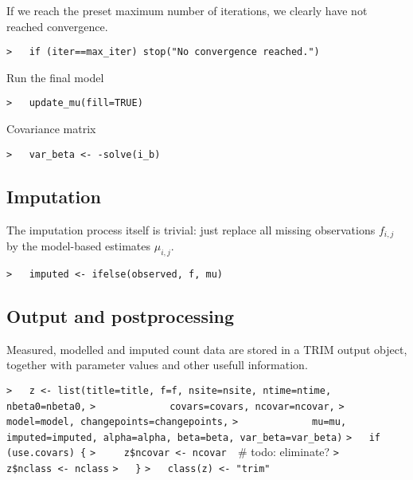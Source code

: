 \documentclass[a4paper]{article}
\begin{document}
If we reach the preset maximum number of iterations, we clearly have not reached
convergence.\par
\verb~>   if (iter==max_iter) stop("No convergence reached.")~\par

Run the final model\par
\verb~>   update_mu(fill=TRUE)~\par

Covariance matrix\par
\verb~>   var_beta <- -solve(i_b)~\par



\subsection{Imputation}\par

The imputation process itself is trivial: just replace all missing observations
$f_{i,j}$ by the model-based estimates $\mu_{i,j}$.\par
\verb~>   imputed <- ifelse(observed, f, mu)~\par




\subsection{Output and postprocessing}\par

Measured, modelled and imputed count data are stored in a TRIM output object,
together with parameter values and other usefull information.\par

\verb~>   z <- list(title=title, f=f, nsite=nsite, ntime=ntime, nbeta0=nbeta0,~\newline
\verb~>             covars=covars, ncovar=ncovar,~\newline
\verb~>             model=model, changepoints=changepoints,~\newline
\verb~>             mu=mu, imputed=imputed, alpha=alpha, beta=beta, var_beta=var_beta)~\newline
\verb~>   if (use.covars) {~\newline
\verb~>     z$ncovar <- ncovar  ~{\sffamily\# todo: eliminate?}\newline
\verb~>     z$nclass <- nclass~\newline
\verb~>   }~\newline
\verb~>   class(z) <- "trim"~\par
\end{document}
